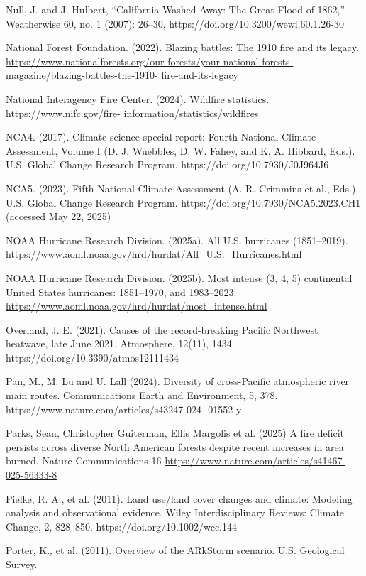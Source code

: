 \documentclass[12pt,paper=a4,DIV=12,parskip=never,chapterprefix=false,headings=standardclasses]{scrreprt}
\begin{document}
Null, J. and J. Hulbert, “California Washed Away: The Great Flood of 1862,” Weatherwise 60, no. 1
(2007): 26–30, https://doi.org/10.3200/wewi.60.1.26-30

National Forest Foundation. (2022). Blazing battles: The 1910 fire and its legacy.
\url{https://www.nationalforests.org/our-forests/your-national-forests-magazine/blazing-battles-the-1910-
fire-and-its-legacy}

National Interagency Fire Center. (2024). Wildfire statistics. https://www.nifc.gov/fire-
information/statistics/wildfires

NCA4. (2017). Climate science special report: Fourth National Climate Assessment, Volume I (D. J.
Wuebbles, D. W. Fahey, and K. A. Hibbard, Eds.). U.S. Global Change Research Program.
https://doi.org/10.7930/J0J964J6

NCA5. (2023). Fifth National Climate Assessment (A. R. Crimmins et al., Eds.). U.S. Global Change
Research Program. https://doi.org/10.7930/NCA5.2023.CH1 (accessed May 22, 2025)

NOAA Hurricane Research Division. (2025a). All U.S. hurricanes (1851–2019).
\url{https://www.aoml.noaa.gov/hrd/hurdat/All_U.S._Hurricanes.html}

NOAA Hurricane Research Division. (2025b). Most intense (3, 4, 5) continental United States
hurricanes: 1851–1970, and 1983–2023. \url{https://www.aoml.noaa.gov/hrd/hurdat/most_intense.html}

Overland, J. E. (2021). Causes of the record-breaking Pacific Northwest heatwave, late June 2021.
Atmosphere, 12(11), 1434. https://doi.org/10.3390/atmos12111434

Pan, M., M. Lu and U. Lall (2024). Diversity of cross-Pacific atmospheric river main routes.
Communications Earth and Environment, 5, 378. https://www.nature.com/articles/s43247-024-
01552-y

Parks, Sean, Christopher Guiterman, Ellis Margolis et al. (2025) A fire deficit persists across diverse
North American forests despite recent increases in area burned. Nature Communications 16
\url{https://www.nature.com/articles/s41467-025-56333-8}

Pielke, R. A., et al. (2011). Land use/land cover changes and climate: Modeling analysis and
observational evidence. Wiley Interdisciplinary Reviews: Climate Change, 2, 828–850.
https://doi.org/10.1002/wcc.144

Porter, K., et al. (2011). Overview of the ARkStorm scenario. U.S. Geological Survey.
\end{document}
